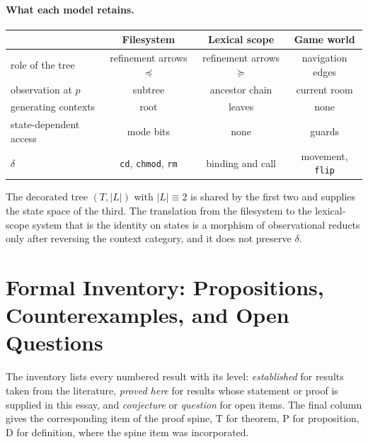 \paragraph{What each model retains.}
\begin{center}
\begin{tabular}{lccc}
\toprule
 & Filesystem & Lexical scope & Game world\\
\midrule
role of the tree & refinement arrows $\preceq$ & refinement arrows $\succeq$ & navigation edges\\
observation at $p$ & subtree & ancestor chain & current room\\
generating contexts & root & leaves & none\\
state-dependent access & mode bits & none & guards\\
$\delta$ & \texttt{cd}, \texttt{chmod}, \texttt{rm} & binding and call & movement, \texttt{flip}\\
\bottomrule
\end{tabular}
\end{center}
The decorated tree $(T,|L|)$ with $|L|\equiv2$ is shared by the first two and supplies the state space of the third. The translation from the filesystem to the lexical-scope system that is the identity on states is a morphism of observational reducts only after reversing the context category, and it does not preserve $\delta$.

\section{Formal Inventory: Propositions, Counterexamples, and Open Questions}

The inventory lists every numbered result with its level: \emph{established} for results taken from the literature, \emph{proved here} for results whose statement or proof is supplied in this essay, and \emph{conjecture} or \emph{question} for open items. The final column gives the corresponding item of the proof spine, T for theorem, P for proposition, D for definition, where the spine item was incorporated.

